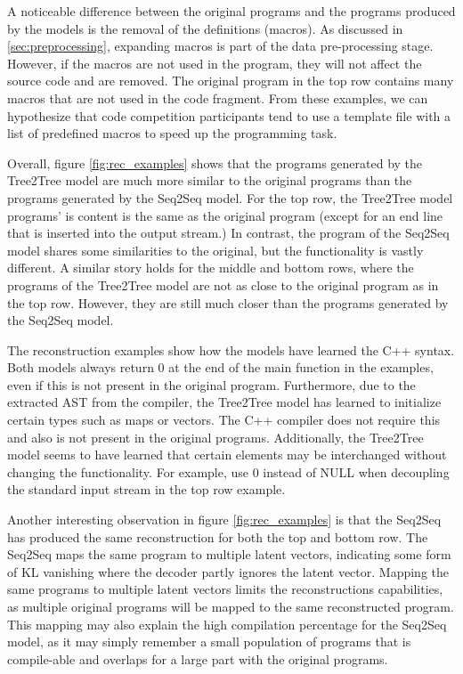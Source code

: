 A noticeable difference between the original programs and the programs produced by the models is the removal of the definitions (macros). 
As discussed in \ref{sec:preprocessing}, expanding macros is part of the data pre-processing stage. However, if the macros are not used in the program, they will not affect the source code and are removed. The original program in the top row contains many macros that are not used in the code fragment. From these examples, we can hypothesize that code competition participants tend to use a template file with a list of predefined macros to speed up the programming task.



Overall, figure \ref{fig:rec_examples} shows that the programs generated by the Tree2Tree model are much more similar to the original programs than the programs generated by the Seq2Seq model. For the top row, the Tree2Tree model programs' is content is the same as the original program (except for an end line that is inserted into the output stream.) In contrast, the program of the Seq2Seq model shares some similarities to the original, but the functionality is vastly different. A similar story holds for the middle and bottom rows, where the programs of the Tree2Tree model are not as close to the original program as in the top row. However, they are still much closer than the programs generated by the Seq2Seq model. 



The reconstruction examples show how the models have learned the C++ syntax. Both models always return 0 at the end of the main function in the examples, even if this is not present in the original program. Furthermore, due to the extracted AST from the compiler, the Tree2Tree model has learned to initialize certain types such as maps or vectors. The C++ compiler does not require this and also is not present in the original programs. Additionally, the Tree2Tree model seems to have learned that certain elements may be interchanged without changing the functionality. For example, use 0 instead of NULL when decoupling the standard input stream in the top row example. 



Another interesting observation in figure \ref{fig:rec_examples} is that the Seq2Seq has produced the same reconstruction for both the top and bottom row. The Seq2Seq maps the same program to multiple latent vectors, indicating some form of KL vanishing where the decoder partly ignores the latent vector. Mapping the same programs to multiple latent vectors limits the reconstructions capabilities, as multiple original programs will be mapped to the same reconstructed program. This mapping may also explain the high compilation percentage for the Seq2Seq model, as it may simply remember a small population of programs that is compile-able and overlaps for a large part with the original programs. 



